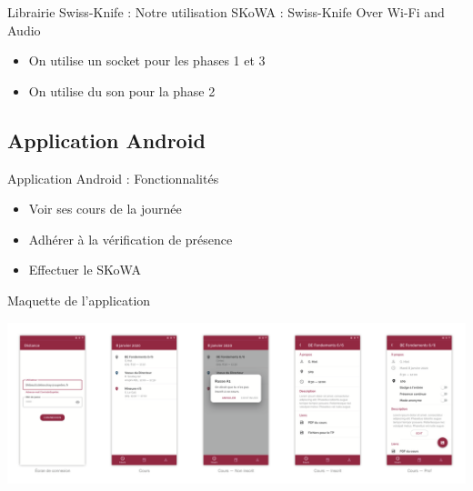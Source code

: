 \documentclass[aspectratio=169]{beamer}
\begin{document}
\begin{frame}{Librairie Swiss-Knife : Notre utilisation}
  SKoWA : Swiss-Knife Over Wi-Fi and Audio
  \bigskip

  \begin{itemize}
    \item On utilise un socket pour les phases 1 et 3
    \item On utilise du son pour la phase 2
  \end{itemize}
\end{frame}

\subsection{Application Android}

\begin{frame}{Application Android : Fonctionnalités}

  \begin{itemize}
    \item Voir ses cours de la journée
    \item Adhérer à la vérification de présence
    \item Effectuer le SKoWA
  \end{itemize}

\end{frame}

\begin{frame}{Maquette de l'application}
  \begin{adjustwidth}{-1.8em}{2em}
    \centering
    \includegraphics[width=1.1\linewidth]{../assets/maquette.png}
  \end{adjustwidth}
\end{frame}
\end{document}
